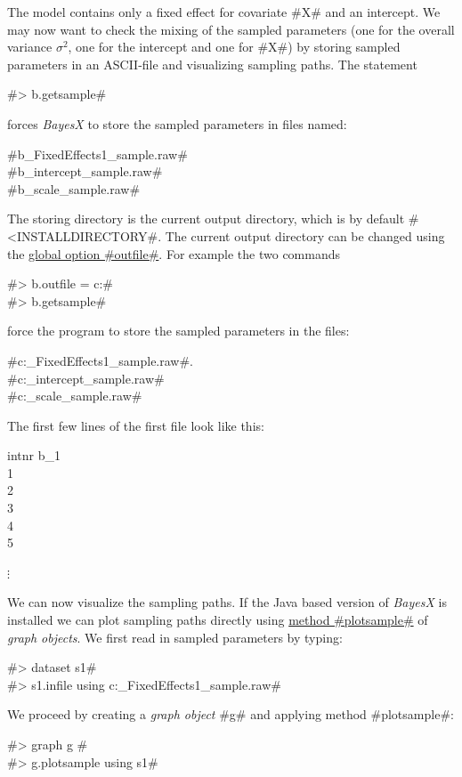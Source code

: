 The model contains only a fixed effect for covariate #X# and an
intercept. We may now want to check the mixing of the sampled
parameters (one for the overall variance $\sigma^2$, one for the
intercept and one for #X#) by storing sampled parameters in an
ASCII-file and visualizing sampling paths. The statement

#> b.getsample#

forces {\em BayesX} to store the sampled parameters in files
named:

#b_FixedEffects1_sample.raw# \\
#b_intercept_sample.raw# \\
#b_scale_sample.raw#

The storing directory is the current output directory, which is by
default #<INSTALLDIRECTORY\output#. The current output directory
can be changed using the \hyperref[bayesregglobopt]{global option
#outfile#}. For example the two commands

#> b.outfile = c:\data{}# \\
#> b.getsample#

force the program  to store the sampled parameters in the files:

#c:\data{}_FixedEffects1_sample.raw#. \\
#c:\data{}_intercept_sample.raw# \\
#c:\data{}_scale_sample.raw#


The first few lines of the first file look like this:

intnr \quad b\_1  \\
1   \\
2   \\
3   \\
4   \\
5 

\hspace {1cm} $\vdots$

We can now visualize the sampling paths. If the Java based version
of {\em BayesX} is installed we can plot sampling paths directly
using \hyperref[graphplotsample]{method #plotsample#} of {\em
graph objects}. We first read in sampled parameters by typing:

#> dataset s1# \\
#> s1.infile using c:\data{}_FixedEffects1_sample.raw#

We proceed by creating a {\em graph object} #g# and applying
method #plotsample#:

#> graph g #\\
#> g.plotsample using s1#

